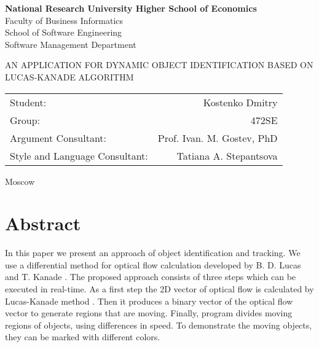 \documentclass[12pt,a4paper,oneside,titlepage]{article}
\author{Kostenko}
\begin{document}
{
\thispagestyle{empty}
\newpage
\centering

\textbf{
National Research University Higher School of Economics\\
}
Faculty of Business Informatics\\
School of Software Engineering\\
Software Management Department

\vfill


\begin{large}
\MakeTextUppercase{
An Application for Dynamic Object Identification Based on Lucas-Kanade Algorithm
}
\end{large}


\vfill

\begin{tabular}{lr}
Student: & Kostenko Dmitry \\
Group: & 472SE \\
Argument Consultant: & Prof. Ivan. M. Gostev, PhD \\
Style and Language Consultant: & Tatiana A. Stepantsova
\end{tabular}

\vspace{\fill}

Moscow\\ \number\year
\clearpage
}

\section*{Abstract}
{
In this paper we present an approach of object identification and tracking.
We use a differential method for optical flow calculation developed by B. D. Lucas and T. Kanade \cite{lucasKanade}.
The proposed approach consists of three steps which can be executed in real-time.
As a first step the 2D vector of optical flow is calculated by Lucas-Kanade method \cite{lucasKanade}.
Then it produces a binary vector of the optical flow vector to generate regions that are moving.  
Finally, program divides moving regions of objects, using differences in speed.
To demonstrate the moving objects, they can be marked with different colors.
}


{
\newpage
\centering
\tableofcontents
}


\newpage
\end{document}
